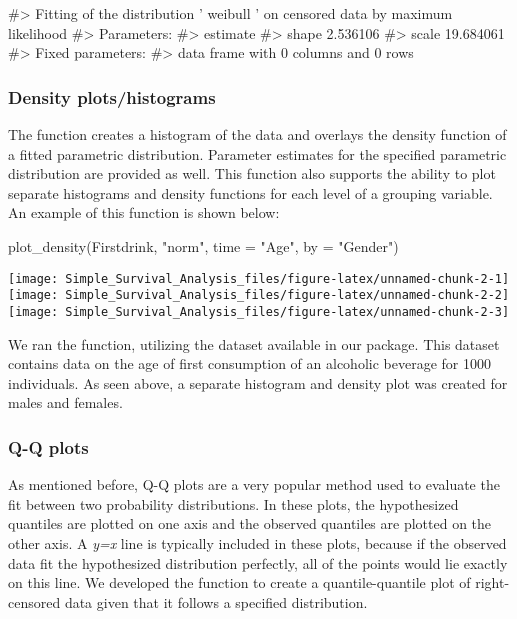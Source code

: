\begin{Schunk}
\begin{Soutput}
#> Fitting of the distribution ' weibull ' on censored data by maximum likelihood 
#> Parameters:
#>        estimate
#> shape  2.536106
#> scale 19.684061
#> Fixed parameters:
#> data frame with 0 columns and 0 rows
\end{Soutput}
\end{Schunk}

\hypertarget{density-plotshistograms}{%
\subsubsection{Density plots/histograms}\label{density-plotshistograms}}

The  function creates a histogram of the data and
overlays the density function of a fitted parametric distribution.
Parameter estimates for the specified parametric distribution are
provided as well. This function also supports the ability to plot
separate histograms and density functions for each level of a grouping
variable. An example of this function is shown below:

\begin{Schunk}
\begin{Sinput}
plot_density(Firstdrink, "norm", time = "Age", by = "Gender")
\end{Sinput}

\texttt{[image: Simple\_Survival\_Analysis\_files/figure-latex/unnamed-chunk-2-1]} 
\texttt{[image: Simple\_Survival\_Analysis\_files/figure-latex/unnamed-chunk-2-2]} 
\texttt{[image: Simple\_Survival\_Analysis\_files/figure-latex/unnamed-chunk-2-3]} \end{Schunk}

We ran the  function, utilizing the
 dataset available in our package. This dataset
contains data on the age of first consumption of an alcoholic beverage
for 1000 individuals. As seen above, a separate histogram and density
plot was created for males and females.

\hypertarget{q-q-plots}{%
\subsubsection{Q-Q plots}\label{q-q-plots}}

As mentioned before, Q-Q plots are a very popular method used to
evaluate the fit between two probability distributions. In these plots,
the hypothesized quantiles are plotted on one axis and the observed
quantiles are plotted on the other axis. A \emph{y=x} line is typically
included in these plots, because if the observed data fit the
hypothesized distribution perfectly, all of the points would lie exactly
on this line. We developed the  function to create a
quantile-quantile plot of right-censored data given that it follows a
specified distribution.

